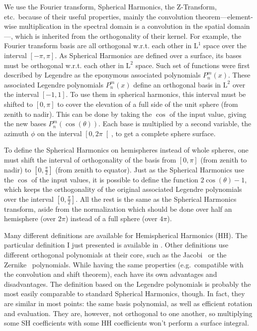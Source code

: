\documentclass{report}
\begin{document}
We use the Fourier transform, Spherical Harmonics, the Z-Transform, etc.\ because of their useful properties, mainly the convolution theorem---element-wise multiplication in the spectral domain is a convolution in the spatial domain---, which is inherited from the orthogonality of their kernel. For example, the Fourier transform basis are all orthogonal w.r.t. each other in $\mathrm{L}^1$ space over the interval $\left[-\pi, \pi\right]$. As Spherical Harmonics are defined over a surface, its bases must be orthogonal w.r.t. each other in $\mathrm{L}^2$ space. Such set of functions were first described by Legendre as the eponymous associated polynomials $P_n^m(x)$. These associated Legendre polynomials $P_n^m(x)$ define an orthogonal basis in $\mathrm{L}^2$ over the interval $\left[ -1, 1 \right]$. To use them in spherical harmonics, this interval must be shifted to $\left[ 0, \pi \right]$ to cover the elevation of a full side of the unit sphere (from zenith to nadir). This can be done by taking the $\cos$ of the input value, giving the new bases $P_n^m\left(\cos(\theta)\right)$. Each base is multiplied by a second variable, the azimuth $\phi$ on the interval $\left[ 0, 2\pi \right[$, to get a complete sphere surface.

To define the Spherical Harmonics on hemispheres instead of whole spheres, one must shift the interval of orthogonality of the basis from $\left[ 0, \pi \right]$ (from zenith to nadir) to $\left[ 0, \frac{\pi}{2} \right]$ (from zenith to equator). Just as the Spherical Harmonics use the $\cos$ of the input values, it is possible to define the function $2\cos(\theta)-1$, which keeps the orthogonality of the original associated Legendre polynomials over the interval $\left[ 0, \frac{\pi}{2} \right]$. All the rest is the same as the Spherical Harmonics transform, aside from the normalization which should be done over half an hemisphere (over $2\pi$) instead of a full sphere (over $4\pi$).

Many different definitions are available for Hemispherical Harmonics (HH). The particular definition I just presented is available in \cite{Gautron2004}. Other definitions use different orthogonal polynomials at their core, such as the Jacobi~\cite{Makhotkin1996} or the Zernike~\cite{Koenderink1996} polynomials. While having the same properties (e.g.\ compatible with the convolution and shift theorem), each have its own advantages and disadvantages. The definition based on the Legendre polynomials is probably the most easily comparable to standard Spherical Harmonics, though. In fact, they are similar in most points: the same basis polynomial, as well as efficient rotation and evaluation. They are, however, not orthogonal to one another, so multiplying some SH coefficients with some HH coefficients won't perform a surface integral.
\end{document}
